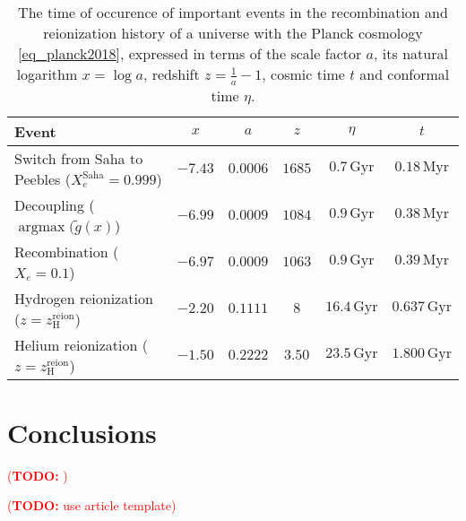 \documentclass[10pt,a4paper]{article}
\newcommand\TODO[1]{\textcolor{red}{(\textbf{TODO:} #1)}}
\DeclareMathOperator{\argmax}{argmax}
\begin{document}
\begin{table}
\centering
\caption{%
	The time of occurence of important events in the recombination and reionization history of a universe with the Planck cosmology \eqref{eq_planck2018},
	expressed in terms of the scale factor $a$, its natural logarithm $x = \log a$, redshift $z = \frac1a - 1$, cosmic time $t$ and conformal time $\eta$.
}
\label{table_times2}
\begin{tabular}{l c c c c c}
	\toprule
	Event                                                               & $x$     & $a$       & $z$    & $\eta$    & $t$ \\
	\midrule
	Switch from Saha to Peebles ($X_e^\text{Saha} = 0.999$) & $-7.43$ & $0.0006$  & $1685$ & $0.7\,\mathrm{Gyr}$ & $0.18\,\mathrm{Myr}$ \\
	Decoupling ($\argmax(\tilde{g}(x)$)                     & $-6.99$ & $0.0009$  & $1084$ & $0.9\,\mathrm{Gyr}$ & $0.38\,\mathrm{Myr}$ \\
	Recombination ($X_e = 0.1$)                             & $-6.97$ & $0.0009$  & $1063$ & $0.9\,\mathrm{Gyr}$ & $0.39\,\mathrm{Myr}$ \\
	Hydrogen reionization ($z = z^\text{reion}_\text{H}$)   & $-2.20$ & $0.1111$  & $8$    & $16.4\,\mathrm{Gyr}$ & $0.637\,\mathrm{Gyr}$ \\
	Helium reionization ($z = z^\text{reion}_\text{H}$)     & $-1.50$ & $0.2222$  & $3.50$ & $23.5\,\mathrm{Gyr}$ & $1.800\,\mathrm{Gyr}$ \\
	\bottomrule
\end{tabular}
\end{table}

\clearpage
\section{Conclusions}

\TODO{}

\TODO{use article template}

%
\printbibliography
\end{document}
